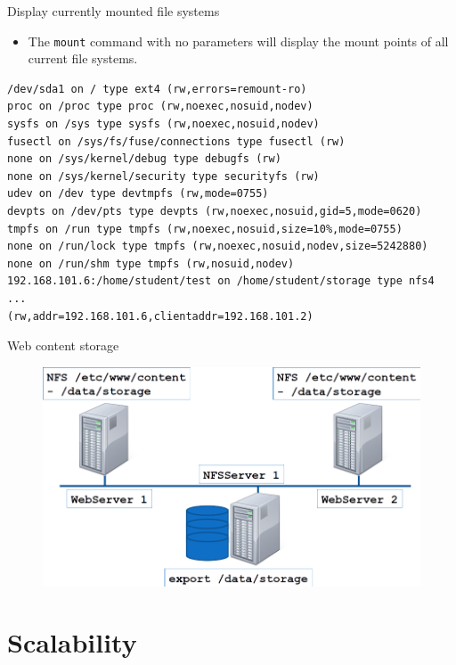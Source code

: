 \documentclass[xcolor=table,aspectratio=169]{beamer}
\begin{document}
\begin{frame}[fragile]{Display currently mounted file systems}
  \begin{itemize}
    \item The \texttt{mount} command with no parameters will display the mount points of all current file systems.
  \end{itemize}
  \begin{tcolorbox}
    \lstset{
      basicstyle=\tiny\ttfamily,
    }
    \begin{lstlisting}
/dev/sda1 on / type ext4 (rw,errors=remount-ro)
proc on /proc type proc (rw,noexec,nosuid,nodev)
sysfs on /sys type sysfs (rw,noexec,nosuid,nodev)
fusectl on /sys/fs/fuse/connections type fusectl (rw)
none on /sys/kernel/debug type debugfs (rw)
none on /sys/kernel/security type securityfs (rw)
udev on /dev type devtmpfs (rw,mode=0755)
devpts on /dev/pts type devpts (rw,noexec,nosuid,gid=5,mode=0620)
tmpfs on /run type tmpfs (rw,noexec,nosuid,size=10%,mode=0755)
none on /run/lock type tmpfs (rw,noexec,nosuid,nodev,size=5242880)
none on /run/shm type tmpfs (rw,nosuid,nodev)
192.168.101.6:/home/student/test on /home/student/storage type nfs4 ...
(rw,addr=192.168.101.6,clientaddr=192.168.101.2)
    \end{lstlisting}
  \end{tcolorbox}
\end{frame}

\begin{frame}{Web content storage}
  \begin{figure}
    \begin{center}
      \includegraphics[width=0.7\linewidth]{webstorage.png}
    \end{center}
  \end{figure}
\end{frame}

\section{Scalability}
\end{document}
